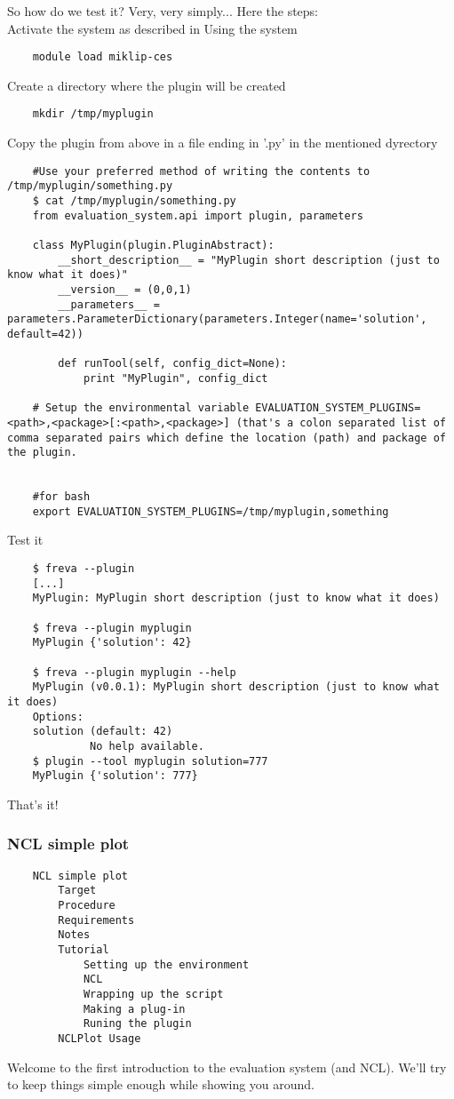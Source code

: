 \documentclass[a4paper,11pt]{ltxdoc}
\begin{document}
So how do we test it? Very, very simply... Here the steps: \\

    Activate the system as described in Using the system
\begin{verbatim}
    module load miklip-ces
\end{verbatim}
    Create a directory where the plugin will be created
\begin{verbatim}
    mkdir /tmp/myplugin
\end{verbatim}
    Copy the plugin from above in a file ending in '.py' in the mentioned dyrectory
\begin{verbatim}
    #Use your preferred method of writing the contents to /tmp/myplugin/something.py
    $ cat /tmp/myplugin/something.py
    from evaluation_system.api import plugin, parameters

    class MyPlugin(plugin.PluginAbstract):
        __short_description__ = "MyPlugin short description (just to know what it does)" 
        __version__ = (0,0,1)
        __parameters__ =  parameters.ParameterDictionary(parameters.Integer(name='solution', default=42))

        def runTool(self, config_dict=None):
            print "MyPlugin", config_dict

    # Setup the environmental variable EVALUATION_SYSTEM_PLUGINS=<path>,<package>[:<path>,<package>] (that's a colon separated list of comma separated pairs which define the location (path) and package of the plugin.
     

    #for bash
    export EVALUATION_SYSTEM_PLUGINS=/tmp/myplugin,something
\end{verbatim}
    Test it
\begin{verbatim}
    $ freva --plugin
    [...]
    MyPlugin: MyPlugin short description (just to know what it does)

    $ freva --plugin myplugin
    MyPlugin {'solution': 42}

    $ freva --plugin myplugin --help
    MyPlugin (v0.0.1): MyPlugin short description (just to know what it does)
    Options:
    solution (default: 42)
             No help available.
    $ plugin --tool myplugin solution=777
    MyPlugin {'solution': 777}
\end{verbatim}
That's it!

\subsubsection{NCL simple plot}
\begin{verbatim}
    NCL simple plot
        Target
        Procedure
        Requirements
        Notes
        Tutorial
            Setting up the environment
            NCL
            Wrapping up the script
            Making a plug-in
            Runing the plugin
        NCLPlot Usage
\end{verbatim}
Welcome to the first introduction to the evaluation system (and NCL). We'll try to keep things simple enough while showing you around.
\end{document}
